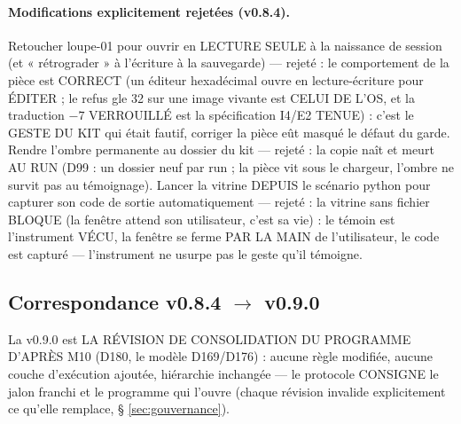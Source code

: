 \paragraph{Modifications explicitement rejetées (v0.8.4).} Retoucher
loupe-01 pour ouvrir en LECTURE SEULE à la naissance de session (et
« rétrograder » à l'écriture à la sauvegarde) — rejeté : le comportement
de la pièce est CORRECT (un éditeur hexadécimal ouvre en lecture-écriture
pour ÉDITER ; le refus gle 32 sur une image vivante est CELUI DE L'OS, et
la traduction $-7$ VERROUILLÉ est la spécification I4/E2 TENUE) : c'est
le GESTE DU KIT qui était fautif, corriger la pièce eût masqué le défaut
du garde. Rendre l'ombre  permanente au dossier
du kit — rejeté : la copie naît et meurt AU RUN (D99 : un dossier neuf
par run ; la pièce vit sous le chargeur, l'ombre ne survit pas au
témoignage). Lancer la vitrine DEPUIS le scénario python pour capturer
son code de sortie automatiquement — rejeté : la vitrine sans fichier
BLOQUE (la fenêtre attend son utilisateur, c'est sa vie) : le témoin
 est l'instrument VÉCU, la fenêtre se ferme PAR LA MAIN de
l'utilisateur, le code est capturé — l'instrument ne usurpe pas le
geste qu'il témoigne.

\subsection{Correspondance v0.8.4 $\to$ v0.9.0}\label{sec:evolutions090}

La v0.9.0 est LA RÉVISION DE CONSOLIDATION DU PROGRAMME D'APRÈS M10 (D180, le
modèle D169/D176) : aucune règle modifiée, aucune couche d'exécution ajoutée,
hiérarchie inchangée — le protocole CONSIGNE le jalon franchi et le programme
qui l'ouvre (chaque révision invalide explicitement ce qu'elle remplace, §
\ref{sec:gouvernance}).

